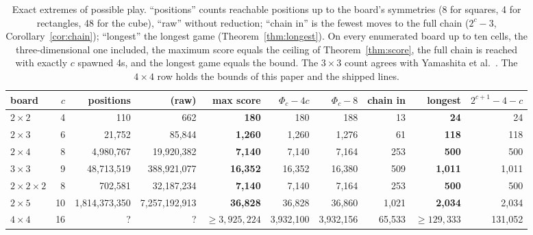\documentclass[11pt]{article}
\theoremstyle{definition}
\theoremstyle{remark}
\begin{document}
\begin{table}[t]
\centering\footnotesize\setlength{\tabcolsep}{3.5pt}
\begin{tabular}{@{}lrrrrrrrrr@{}}
\toprule
board & $c$ & positions & (raw) & max score & $\Phi_c-4c$ & $\Phi_c-8$ & chain in & longest & $2^{c+1}-4-c$ \\
\midrule
$2\times2$ & 4 & 110 & 662 & \textbf{180} & 180 & 188 & 13 & \textbf{24} & 24 \\
$2\times3$ & 6 & 21{,}752 & 85{,}844 & \textbf{1{,}260} & 1{,}260 & 1{,}276 & 61 & \textbf{118} & 118 \\
$2\times4$ & 8 & 4{,}980{,}767 & 19{,}920{,}382 & \textbf{7{,}140} & 7{,}140 & 7{,}164 & 253 & \textbf{500} & 500 \\
$3\times3$ & 9 & 48{,}713{,}519 & 388{,}921{,}077 & \textbf{16{,}352} & 16{,}352 & 16{,}380 & 509 & \textbf{1{,}011} & 1{,}011 \\
$2\times2\times2$ & 8 & 702{,}581 & 32{,}187{,}234 & \textbf{7{,}140} & 7{,}140 & 7{,}164 & 253 & \textbf{500} & 500 \\
$2\times5$ & 10 & 1{,}814{,}373{,}350 & 7{,}257{,}192{,}913 & \textbf{36{,}828} & 36{,}828 & 36{,}860 & 1{,}021 & \textbf{2{,}034} & 2{,}034 \\
$4\times4$ & 16 & ? & ? & $\ge3{,}925{,}224$ & 3{,}932{,}100 & 3{,}932{,}156 & 65{,}533 & $\ge129{,}333$ & 131{,}052 \\
\bottomrule
\end{tabular}
\caption{Exact extremes of possible play. ``positions'' counts reachable
positions up to the board's symmetries (8 for squares, 4 for rectangles,
48 for the cube), ``raw'' without reduction; ``chain in'' is the fewest moves to the full
chain ($2^c-3$, Corollary~\ref{cor:chain}); ``longest'' the longest game
(Theorem~\ref{thm:longest}). On every enumerated board up to ten cells, the
three-dimensional one included, the maximum score equals the ceiling of
Theorem~\ref{thm:score}, the full chain is reached with exactly $c$
spawned 4s, and the longest game equals the bound.
The $3\times3$ count agrees with Yamashita et al.\
\cite{yamashita2022,kaneko2026}. The $4\times4$ row holds the bounds of
this paper and the shipped lines.}
\label{tab:exact}
\end{table}
\end{document}
